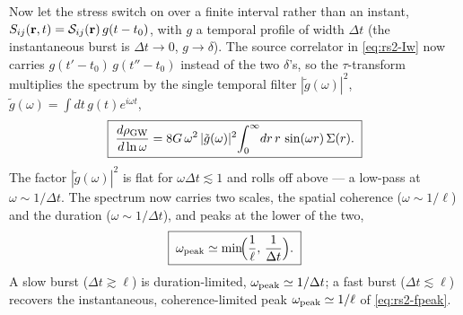 \documentclass[10pt,prd,aps,nobibnotes,superscriptaddress,preprintnumbers,notitlepage]{revtex4-1}
\newcommand{\br}{{\bf r}}
\begin{document}
Now let the stress switch on over a finite interval rather than an instant,
$S_{ij}(\br,t)=\mathcal{S}_{ij}(\br)\,g(t-t_0)$, with $g$ a temporal profile of width
$\Delta t$ (the instantaneous burst is $\Delta t\to0$, $g\to\delta$). The source
correlator in \eqref{eq:rs2-Iw} now carries $g(t'-t_0)\,g(t''-t_0)$ instead of the two
$\delta$'s, so the $\tau$-transform multiplies the spectrum by the single temporal
filter $|\tilde g(\omega)|^2$, $\tilde g(\omega)=\int\!dt\,g(t)e^{i\omega t}$,
\begin{equation}
  \boxed{\;
  \frac{d\rho_{\rm GW}}{d\ln\omega}
  =8G\,\omega^2\,|\tilde g(\omega)|^2\!
  \int_0^\infty\!dr\,r\,\sin(\omega r)\,\Sigma(r).\;}
  \label{eq:rs2-spectrum-dt}
\end{equation}
The factor $|\tilde g(\omega)|^2$ is flat for $\omega\Delta t\lesssim1$ and rolls off
above --- a low-pass at $\omega\sim1/\Delta t$. The spectrum now carries two scales,
the spatial coherence ($\omega\sim1/\ell$) and the duration ($\omega\sim1/\Delta t$),
and peaks at the lower of the two,
\begin{equation}
  \boxed{\;
  \omega_{\rm peak}\simeq\min\!\Bigl(\frac{1}{\ell},\,\frac{1}{\Delta t}\Bigr).\;}
  \label{eq:rs2-fpeak-dt}
\end{equation}
A slow burst ($\Delta t\gtrsim\ell$) is duration-limited,
$\omega_{\rm peak}\simeq1/\Delta t$; a fast burst ($\Delta t\lesssim\ell$) recovers the
instantaneous, coherence-limited peak $\omega_{\rm peak}\simeq1/\ell$ of
\eqref{eq:rs2-fpeak}.
\end{document}
